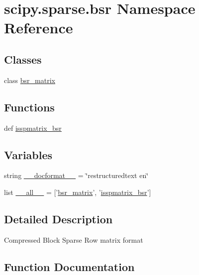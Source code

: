 \hypertarget{namespacescipy_1_1sparse_1_1bsr}{}\section{scipy.\+sparse.\+bsr Namespace Reference}
\label{namespacescipy_1_1sparse_1_1bsr}
\subsection*{Classes}
\begin{DoxyCompactItemize}
\item 
class \hyperlink{classscipy_1_1sparse_1_1bsr_1_1bsr__matrix}{bsr\+\_\+matrix}
\end{DoxyCompactItemize}
\subsection*{Functions}
\begin{DoxyCompactItemize}
\item 
def \hyperlink{namespacescipy_1_1sparse_1_1bsr_aa3f2af92d01a9e67f621b8096e3a3d7d}{isspmatrix\+\_\+bsr}
\end{DoxyCompactItemize}
\subsection*{Variables}
\begin{DoxyCompactItemize}
\item 
string \hyperlink{namespacescipy_1_1sparse_1_1bsr_a1442e4158f33f132acc78f2be27e21a2}{\+\_\+\+\_\+docformat\+\_\+\+\_\+} = \char`\"{}restructuredtext en\char`\"{}
\item 
list \hyperlink{namespacescipy_1_1sparse_1_1bsr_a7d40c4be090c61d48b2faa8030c6afef}{\+\_\+\+\_\+all\+\_\+\+\_\+} = \mbox{[}'\hyperlink{classscipy_1_1sparse_1_1bsr_1_1bsr__matrix}{bsr\+\_\+matrix}', '\hyperlink{namespacescipy_1_1sparse_1_1bsr_aa3f2af92d01a9e67f621b8096e3a3d7d}{isspmatrix\+\_\+bsr}'\mbox{]}
\end{DoxyCompactItemize}


\subsection{Detailed Description}
\begin{DoxyVerb}Compressed Block Sparse Row matrix format\end{DoxyVerb}
 

\subsection{Function Documentation}
\hypertarget{namespacescipy_1_1sparse_1_1bsr_aa3f2af92d01a9e67f621b8096e3a3d7d}{}
